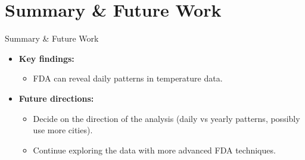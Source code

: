 \documentclass[svgnames, 12pt]{beamer}
\begin{document}
\section{Summary \& Future Work}

\begin{frame}{Summary \& Future Work}
	\begin{itemize}
		\item \textbf{Key findings:}
		\begin{itemize}
			\item FDA can reveal daily patterns in temperature data.
		\end{itemize}
		\item \textbf{Future directions:}
		\begin{itemize}
			\item Decide on the direction of the analysis (daily vs yearly patterns, possibly use more cities).
			\item Continue exploring the data with more advanced FDA techniques.
		\end{itemize}
	\end{itemize}
\end{frame}
\end{document}
